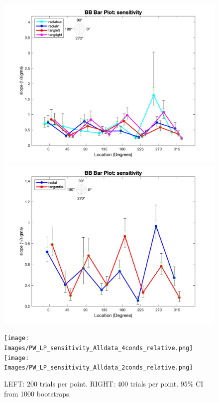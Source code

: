\documentclass[11pt]{article} %
\begin{document}
\begin{figure}[H]
\centering %
\includegraphics[scale=.3]{Images/BB_LP_sensitivity_Alldata_4conds.png}
\includegraphics[scale=.3]{Images/BB_LP_sensitivity_Alldata_2conds.png}
\end{figure}
\begin{figure}[H]
\centering %
\texttt{[image: Images/PW\_LP\_sensitivity\_Alldata\_4conds\_relative.png]}
\texttt{[image: Images/PW\_LP\_sensitivity\_Alldata\_2conds\_relative.png]}
\caption{LEFT: 200 trials per point. RIGHT: 400 trials per point. 95\% CI from 1000 bootstraps.}
\end{figure}

\newpage
\end{document}
